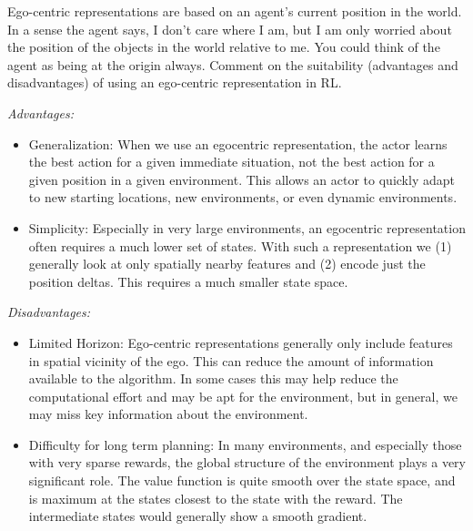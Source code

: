 \documentclass[addpoints,12pt,solution]{exam}
\begin{document}
\begin{questions}
        \question[4] Ego-centric representations are based on an agent’s current position in the world. In a sense the agent says, I don’t care where I am, but I am only worried about the position of the objects in the world relative to me. You could think of the agent as being at the origin always. Comment on the suitability (advantages and disadvantages) of using an ego-centric representation in RL.

        \begin{solution}

            \emph{Advantages:}
            \begin{itemize}
                \item Generalization: When we use an egocentric representation, the actor learns the best action for a given immediate situation,
                not the best action for a given position in a given environment. This allows an actor to quickly adapt to new starting locations, new environments,
                or even dynamic environments.
                \item Simplicity: Especially in very large environments, an egocentric representation often requires a much lower set of states.
                With such a representation we (1) generally look at only spatially nearby features and (2) encode just the position deltas.
                This requires a much smaller state space.
            \end{itemize}

            \emph{Disadvantages:}
            \begin{itemize}
                \item Limited Horizon: Ego-centric representations generally only include features in spatial vicinity of the ego.
                This can reduce the amount of information available to the algorithm. In some cases this may help reduce
                the computational effort and may be apt for the environment, but in general, we may miss key information
                about the environment.
                \item Difficulty for long term planning: In many environments, and especially those with very sparse rewards,
                the global structure of the environment plays a very significant role. The value function is quite smooth over the state space,
                and is maximum at the states closest to the state with the reward. The intermediate states would
                generally show a smooth gradient.


\end{itemize}
\end{solution}
\end{questions}
\end{document}
